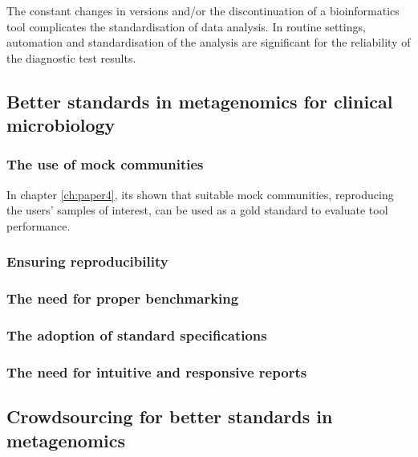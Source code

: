 The constant changes in versions and/or the discontinuation of a bioinformatics tool complicates the standardisation of data analysis. In routine settings, automation and standardisation of the analysis are significant for the reliability of the diagnostic test results.

\subsection{Better standards in metagenomics for clinical microbiology}

\subsubsection{The use of mock communities}

In chapter \ref{ch:paper4}, its shown that suitable mock communities, reproducing the users’ samples of interest, can be used as a gold standard to evaluate tool performance. 

\subsubsection{Ensuring reproducibility}

\subsubsection{The need for proper benchmarking}

\subsubsection{The adoption of standard specifications}

\subsubsection{The need for intuitive and responsive reports}

\subsection{Crowdsourcing for better standards in metagenomics}